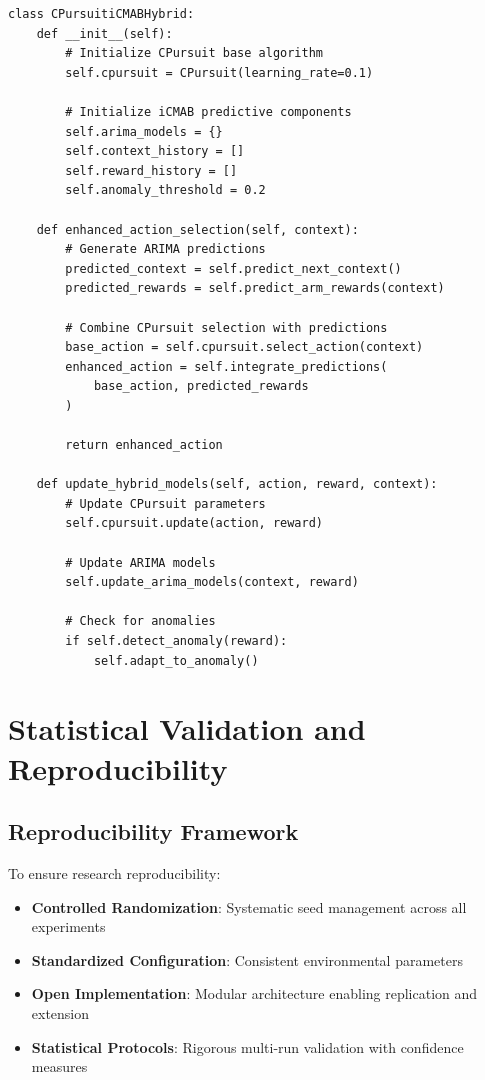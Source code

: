 \documentclass[12pt,a4paper]{article}
\begin{document}
\begin{lstlisting}[caption=CPursuit-iCMAB Hybrid Implementation Framework]
class CPursuitiCMABHybrid:
    def __init__(self):
        # Initialize CPursuit base algorithm
        self.cpursuit = CPursuit(learning_rate=0.1)
        
        # Initialize iCMAB predictive components
        self.arima_models = {}
        self.context_history = []
        self.reward_history = []
        self.anomaly_threshold = 0.2
        
    def enhanced_action_selection(self, context):
        # Generate ARIMA predictions
        predicted_context = self.predict_next_context()
        predicted_rewards = self.predict_arm_rewards(context)
        
        # Combine CPursuit selection with predictions
        base_action = self.cpursuit.select_action(context)
        enhanced_action = self.integrate_predictions(
            base_action, predicted_rewards
        )
        
        return enhanced_action
    
    def update_hybrid_models(self, action, reward, context):
        # Update CPursuit parameters
        self.cpursuit.update(action, reward)
        
        # Update ARIMA models
        self.update_arima_models(context, reward)
        
        # Check for anomalies
        if self.detect_anomaly(reward):
            self.adapt_to_anomaly()
\end{lstlisting}

\section{Statistical Validation and Reproducibility}

\subsection{Reproducibility Framework}

To ensure research reproducibility:

\begin{itemize}
\item \textbf{Controlled Randomization}: Systematic seed management across all experiments
\item \textbf{Standardized Configuration}: Consistent environmental parameters
\item \textbf{Open Implementation}: Modular architecture enabling replication and extension
\item \textbf{Statistical Protocols}: Rigorous multi-run validation with confidence measures
\end{itemize}
\end{document}
